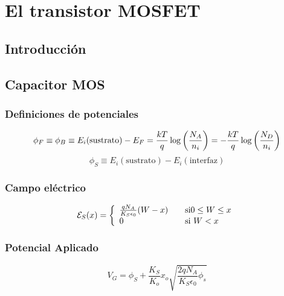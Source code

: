 \chapter{El transistor MOSFET}

\section{Introducción}

\lipsum[1]

\section{Capacitor MOS}

\lipsum[1-2]

\subsection{Definiciones de potenciales}

\lipsum[1]

\begin{equation*}
	\phi_F \equiv \phi_B \equiv E_i(\text{sustrato}) - E_F 
    = \frac{kT}{q} \log \left( \frac{N_A}{n_i} \right) = -\frac{kT}{q} \log \left( \frac{N_D}{n_i} \right) 
\end{equation*}
\begin{equation*}
	\phi_S \equiv E_i(\text{sustrato}) - E_i (\text{interfaz}) 
\end{equation*}

\subsection{Campo eléctrico}

\lipsum[1]

\begin{equation*}
	\mathcal{E}_S (x) = \left\lbrace \begin{array}{ll}
		\frac{qN_A}{K_S \epsilon_0} (W-x) & \quad \text{si} 0\leq W \leq x \\
		0 & \quad \text{si} \ W<x 
	\end{array} \right.
\end{equation*}

\subsection{Potencial Aplicado}

\lipsum[1]

\begin{equation*}
	V_G = \phi_S + \frac{K_S}{K_o} x_o \sqrt{\frac{2qN_A}{K_S\epsilon_0} \phi_s}
\end{equation*}
